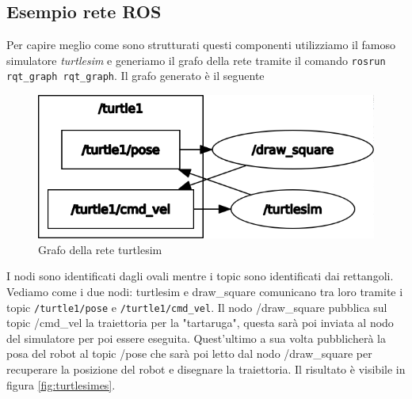 \subsection{Esempio rete ROS}
\label{subsec:esempio_rete_ros}
Per capire meglio come sono strutturati questi componenti utilizziamo il famoso simulatore \textit{turtlesim} e generiamo il grafo della rete tramite il comando \verb+rosrun rqt_graph rqt_graph+. Il grafo generato è il seguente
\begin{figure}[h!]
    \centering
    \includegraphics[scale=0.5]{images/turtlesim.png}
    \caption{Grafo della rete turtlesim}
    \label{fig:turtlesim}
\end{figure}
I nodi sono identificati dagli ovali mentre i topic sono identificati dai rettangoli. Vediamo come i due nodi: turtlesim e draw\_square comunicano tra loro tramite i topic \verb+/turtle1/pose+ e \verb+/turtle1/cmd_vel+. Il nodo /draw\_square pubblica sul topic /cmd\_vel la traiettoria per la "tartaruga", questa sarà poi inviata al nodo del simulatore per poi essere eseguita. Quest'ultimo a sua volta pubblicherà la posa del robot al topic /pose che sarà poi letto dal nodo /draw\_square per recuperare la posizione del robot e disegnare la traiettoria.
Il risultato è visibile in figura \ref{fig:turtlesimes}.
